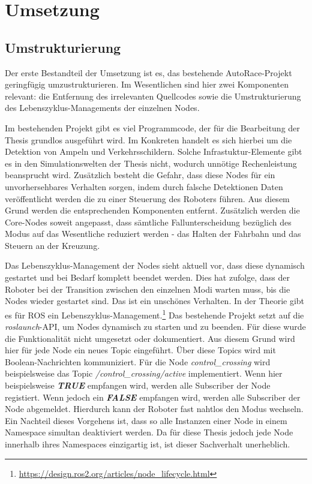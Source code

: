 \chapter{Umsetzung}
\section{Umstrukturierung}
Der erste Bestandteil der Umsetzung ist es, das bestehende AutoRace-Projekt geringfügig umzustrukturieren. Im Wesentlichen sind hier zwei Komponenten relevant: 
die Entfernung des irrelevanten Quellcodes sowie die Umstrukturierung des Lebenszyklus-Managements der einzelnen Nodes.

Im bestehenden Projekt gibt es viel Programmcode, der für die Bearbeitung der Thesis grundlos ausgeführt wird. Im Konkreten handelt es sich hierbei um die Detektion von Ampeln
und Verkehrsschildern. Solche Infrastuktur-Elemente gibt es in den Simulationswelten der Thesis nicht, wodurch unnötige Rechenleistung beansprucht wird. Zusätzlich besteht
die Gefahr, dass diese Nodes für ein unvorhersehbares Verhalten sorgen, indem durch falsche Detektionen Daten veröffentlicht werden die zu einer Steuerung des Roboters führen. 
Aus diesem Grund werden die entsprechenden Komponenten entfernt. Zusätzlich werden die Core-Nodes soweit angepasst, dass sämtliche Fallunterscheidung bezüglich des Modus
auf das Wesentliche reduziert werden - das Halten der Fahrbahn und das Steuern an der Kreuzung. 

Das Lebenszyklus-Management der Nodes sieht aktuell vor, dass diese dynamisch gestartet und bei Bedarf komplett beendet werden. Dies hat zufolge, dass der Roboter bei der Transition
zwischen den einzelnen Modi warten muss, bis die Nodes wieder gestartet sind. Das ist ein unschönes Verhalten. In der Theorie gibt es für ROS ein Lebenszyklus-Management.\footnote{\url{https://design.ros2.org/articles/node_lifecycle.html}} 
Das bestehende Projekt setzt auf die \textit{roslaunch}-API, um Nodes dynamisch zu starten und zu beenden. Für diese wurde die Funktionalität nicht umgesetzt oder dokumentiert. 
Aus diesem Grund wird hier für jede Node ein neues Topic eingeführt. Über diese Topics wird mit Boolean-Nachrichten kommuniziert. Für die Node \textit{control\_crossing} wird beispielsweise
das Topic \textit{/control\_crossing/active} implementiert. Wenn hier beispielsweise \textit{\textbf{TRUE}} empfangen wird, werden alle Subscriber der Node registiert. Wenn jedoch ein \textit{\textbf{FALSE}}
empfangen wird, werden alle Subscriber der Node abgemeldet.
Hierdurch kann der Roboter fast nahtlos den Modus wechseln. Ein Nachteil dieses Vorgehens ist, dass so alle Instanzen einer Node in einem Namespace simultan deaktiviert werden.
Da für diese Thesis jedoch jede Node innerhalb ihres Namespaces einzigartig ist, ist dieser Sachverhalt unerheblich.